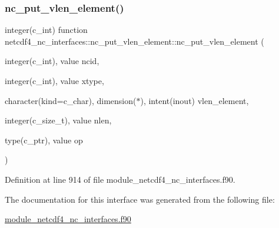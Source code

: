 \subsubsection{\texorpdfstring{nc\+\_\+put\+\_\+vlen\+\_\+element()}{nc\_put\_vlen\_element()}}
{\footnotesize\ttfamily integer(c\+\_\+int) function netcdf4\+\_\+nc\+\_\+interfaces\+::nc\+\_\+put\+\_\+vlen\+\_\+element\+::nc\+\_\+put\+\_\+vlen\+\_\+element (\begin{DoxyParamCaption}\item[{integer(c\+\_\+int), value}]{ncid,  }\item[{integer(c\+\_\+int), value}]{xtype,  }\item[{character(kind=c\+\_\+char), dimension($\ast$), intent(inout)}]{vlen\+\_\+element,  }\item[{integer(c\+\_\+size\+\_\+t), value}]{nlen,  }\item[{type(c\+\_\+ptr), value}]{op }\end{DoxyParamCaption})}



Definition at line 914 of file module\+\_\+netcdf4\+\_\+nc\+\_\+interfaces.\+f90.



The documentation for this interface was generated from the following file\+:\begin{DoxyCompactItemize}
\item 
\hyperlink{module__netcdf4__nc__interfaces_8f90}{module\+\_\+netcdf4\+\_\+nc\+\_\+interfaces.\+f90}\end{DoxyCompactItemize}
